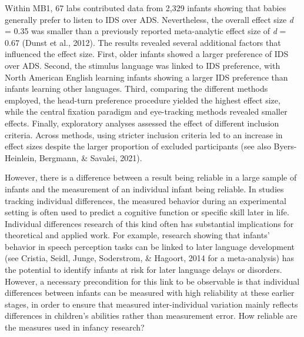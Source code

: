 \documentclass[
  man,floatsintext]{apa6}
\begin{document}
Within MB1, 67 labs contributed data from 2,329 infants showing that babies generally prefer to listen to IDS over ADS.
Nevertheless, the overall effect size \emph{d} = 0.35 was smaller than a previously reported meta-analytic effect size of \emph{d} = 0.67 (Dunst et al., 2012).
The results revealed several additional factors that influenced the effect size.
First, older infants showed a larger preference of IDS over ADS.
Second, the stimulus language was linked to IDS preference, with North American English learning infants showing a larger IDS preference than infants learning other languages.
Third, comparing the different methods employed, the head-turn preference procedure yielded the highest effect size, while the central fixation paradigm and eye-tracking methods revealed smaller effects.
Finally, exploratory analyses assessed the effect of different inclusion criteria.
Across methods, using stricter inclusion criteria led to an increase in effect sizes despite the larger proportion of excluded participants (see also Byers-Heinlein, Bergmann, \& Savalei, 2021).

However, there is a difference between a result being reliable in a large sample of infants and the measurement of an individual infant being reliable.
In studies tracking individual differences, the measured behavior during an experimental setting is often used to predict a cognitive function or specific skill later in life.
Individual differences research of this kind often has substantial implications for theoretical and applied work.
For example, research showing that infants' behavior in speech perception tasks can be linked to later language development (see Cristia, Seidl, Junge, Soderstrom, \& Hagoort, 2014 for a meta-analysis) has the potential to identify infants at risk for later language delays or disorders.
However, a necessary precondition for this link to be observable is that individual differences between infants can be measured with high reliability at these earlier stages, in order to ensure that measured inter-individual variation mainly reflects differences in children's abilities rather than measurement error.
How reliable are the measures used in infancy research?
\end{document}
